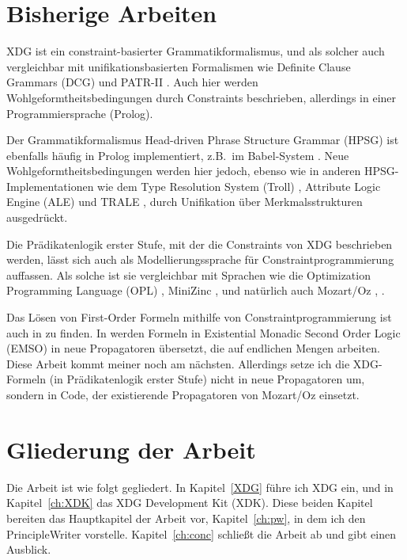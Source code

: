 \section{Bisherige Arbeiten}

XDG ist ein constraint-basierter Grammatikformalismus, und als solcher
auch vergleichbar mit unifikationsbasierten Formalismen wie Definite
Clause Grammars (DCG) und PATR-II \cite{Shieber84}. Auch hier werden
Wohlgeformtheitsbedingungen durch Constraints beschrieben, allerdings
in einer Programmiersprache (Prolog).

Der Grammatikformalismus Head-driven Phrase Structure Grammar (HPSG)
ist ebenfalls h{\"a}ufig in Prolog implementiert, z.B.\ im
Babel-System \cite{Mueller96}. Neue Wohlgeformtheitsbedingungen werden
hier jedoch, ebenso wie in anderen HPSG-Implementationen wie dem Type
Resolution System (Troll) \cite{GerdemannEtal94}, Attribute Logic
Engine (ALE) \cite{CarpenterPenn94} und TRALE \cite{MeurersEtal02},
durch Unifikation {\"u}ber Merkmalsstrukturen ausgedr{\"u}ckt.

Die Pr{\"a}dikatenlogik erster Stufe, mit der die Constraints von XDG
beschrieben werden, l{\"a}sst sich auch als Modellierungssprache
f{\"u}r Constraintprogrammierung auffassen. Als solche ist sie
vergleichbar mit Sprachen wie die Optimization Programming Language
(OPL) \cite{Hentenryck99}, MiniZinc \cite{NethercoteEtal07}, und
nat{\"u}rlich auch Mozart/Oz \cite{Smolka95}, \cite{Schulte02}.

Das L{\"o}sen von First-Order Formeln mithilfe von
Constraintprogrammierung ist auch in \cite{AptVermeulen02} zu finden.
In \cite{TackEtal06} werden Formeln in Existential Monadic Second
Order Logic (EMSO) in neue Propagatoren {\"u}bersetzt, die auf
endlichen Mengen arbeiten.  Diese Arbeit kommt meiner noch am
n{\"a}chsten. Allerdings setze ich die XDG-Formeln (in
Pr{\"a}dikatenlogik erster Stufe) nicht in neue Propagatoren um,
sondern in Code, der existierende Propagatoren von Mozart/Oz einsetzt.

\section{Gliederung der Arbeit}

Die Arbeit ist wie folgt gegliedert. In Kapitel~\ref{XDG} f{\"u}hre
ich XDG ein, und in Kapitel~\ref{ch:XDK} das XDG Development Kit
(XDK). Diese beiden Kapitel bereiten das Hauptkapitel der Arbeit vor,
Kapitel~\ref{ch:pw}, in dem ich den PrincipleWriter vorstelle.
Kapitel~\ref{ch:conc} schlie{\ss}t die Arbeit ab und gibt einen
Ausblick.
